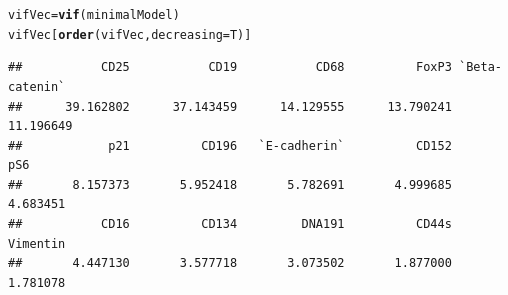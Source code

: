 \documentclass[a4paper]{article}\usepackage[]{graphicx}\usepackage[]{color}
\makeatletter
\newcommand{\hlstd}[1]{\textcolor[rgb]{0.345,0.345,0.345}{#1}}%
\newcommand{\hlkwb}[1]{\textcolor[rgb]{0.69,0.353,0.396}{#1}}%
\newcommand{\hlkwc}[1]{\textcolor[rgb]{0.333,0.667,0.333}{#1}}%
\newcommand{\hlkwd}[1]{\textcolor[rgb]{0.737,0.353,0.396}{\textbf{#1}}}%
\newenvironment{kframe}{%
 \def\at@end@of@kframe{}%
 \ifinner\ifhmode%
  \def\at@end@of@kframe{\end{minipage}}%
  \begin{minipage}{\columnwidth}%
 \fi\fi%
 \def\FrameCommand##1{\hskip\@totalleftmargin \hskip-\fboxsep
 \colorbox{shadecolor}{##1}\hskip-\fboxsep
     \hskip-\linewidth \hskip-\@totalleftmargin \hskip\columnwidth}%
 \MakeFramed {\advance\hsize-\width
   \@totalleftmargin\z@ \linewidth\hsize
   \@setminipage}}%
 {\par\unskip\endMakeFramed%
 \at@end@of@kframe}
\newenvironment{knitrout}{}{} %
\makeatother
\begin{document}
\begin{knitrout}
\color{fgcolor}\begin{kframe}
\begin{alltt}
\hlstd{vifVec} \hlkwb{=} \hlkwd{vif}\hlstd{(minimalModel)}
\hlstd{vifVec[}\hlkwd{order}\hlstd{(vifVec,}\hlkwc{decreasing}\hlstd{=T)]}
\end{alltt}
\begin{verbatim}
##           CD25           CD19           CD68          FoxP3 `Beta-catenin` 
##      39.162802      37.143459      14.129555      13.790241      11.196649 
##            p21          CD196   `E-cadherin`          CD152            pS6 
##       8.157373       5.952418       5.782691       4.999685       4.683451 
##           CD16          CD134         DNA191          CD44s       Vimentin 
##       4.447130       3.577718       3.073502       1.877000       1.781078
\end{verbatim}
\end{kframe}
\end{knitrout}
\end{document}
